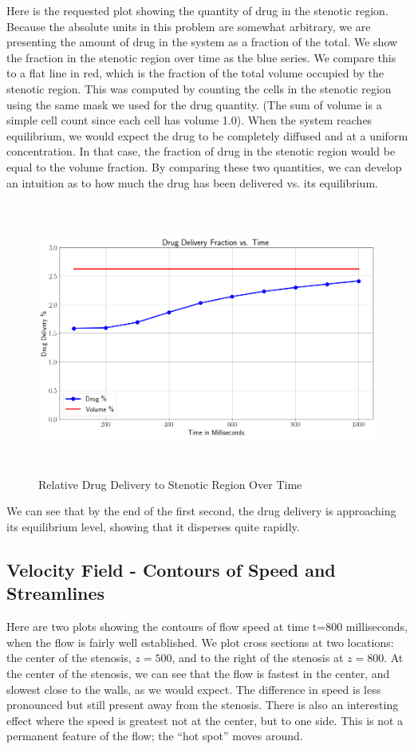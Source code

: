 \documentclass[11pt]{article} %
\begin{document}
Here is the requested plot showing the quantity of drug in the stenotic region.
Because the absolute units in this problem are somewhat arbitrary,
we are presenting the amount of drug in the system as a fraction of the total.
We show the fraction in the stenotic region over time as the blue series.
We compare this to a flat line in red, which is the fraction of the total volume
occupied by the stenotic region.  
This was computed by counting the cells in the stenotic region using the same
mask we used for the drug quantity.  
(The sum of volume is a simple cell count since each cell has volume 1.0).
When the system reaches equilibrium, we would expect the drug to be completely
diffused and at a uniform concentration.  
In that case, the fraction of drug in the stenotic region would be equal to the volume fraction.  
By comparing these two quantities, we can develop an intuition as to how much 
the drug has been delivered vs. its equilibrium.
\begin{figure}[H]
\centering
\includegraphics[width=\linewidth,height=9cm]{drug_frac.png}
\caption{Relative Drug Delivery to Stenotic Region Over Time}
\end{figure}
We can see that by the end of the first second, the drug delivery
is approaching its equilibrium level, showing that it disperses quite rapidly.

\subsection{Velocity Field - Contours of Speed and Streamlines}
Here are two plots showing the contours of flow speed at time t=800 milliseconds, 
when the flow is fairly well established.  
We plot cross sections at two locations: 
the center of the stenosis, $z=500$,
and to the right of the stenosis at $z=800$.
At the center of the stenosis, we can see that the flow is fastest in the center, and slowest close to the walls, as we would expect.
The difference in speed is less pronounced but still present away from the stenosis.
There is also an interesting effect where the speed is greatest not at the center, but to one side.
This is not a permanent feature of the flow; the ``hot spot'' moves around.
\end{document}
